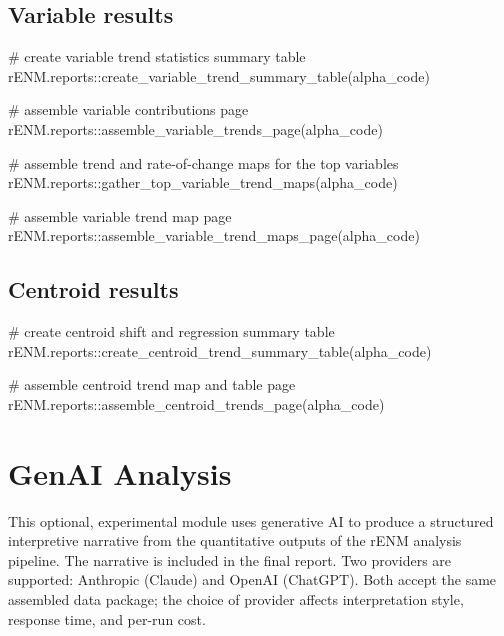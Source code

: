 \documentclass[
  letterpaper,
  DIV=11,
  numbers=noendperiod]{scrartcl}
\newenvironment{Shaded}{\begin{snugshade}}{\end{snugshade}}
\newcommand{\CommentTok}[1]{\textcolor[rgb]{0.37,0.37,0.37}{#1}}
\newcommand{\FunctionTok}[1]{\textcolor[rgb]{0.28,0.35,0.67}{#1}}
\newcommand{\NormalTok}[1]{\textcolor[rgb]{0.00,0.23,0.31}{#1}}
\newcommand{\SpecialCharTok}[1]{\textcolor[rgb]{0.37,0.37,0.37}{#1}}
\begin{document}
\subsection{Variable results}\label{variable-results}

\begin{Shaded}
\begin{Highlighting}[]
\CommentTok{\# create variable trend statistics summary table}
\NormalTok{rENM.reports}\SpecialCharTok{::}\FunctionTok{create\_variable\_trend\_summary\_table}\NormalTok{(alpha\_code)}

\CommentTok{\# assemble variable contributions page}
\NormalTok{rENM.reports}\SpecialCharTok{::}\FunctionTok{assemble\_variable\_trends\_page}\NormalTok{(alpha\_code)}

\CommentTok{\# assemble trend and rate{-}of{-}change maps for the top variables}
\NormalTok{rENM.reports}\SpecialCharTok{::}\FunctionTok{gather\_top\_variable\_trend\_maps}\NormalTok{(alpha\_code)}

\CommentTok{\# assemble variable trend map page}
\NormalTok{rENM.reports}\SpecialCharTok{::}\FunctionTok{assemble\_variable\_trend\_maps\_page}\NormalTok{(alpha\_code)}
\end{Highlighting}
\end{Shaded}

\subsection{Centroid results}\label{centroid-results}

\begin{Shaded}
\begin{Highlighting}[]
\CommentTok{\# create centroid shift and regression summary table}
\NormalTok{rENM.reports}\SpecialCharTok{::}\FunctionTok{create\_centroid\_trend\_summary\_table}\NormalTok{(alpha\_code)}

\CommentTok{\# assemble centroid trend map and table page}
\NormalTok{rENM.reports}\SpecialCharTok{::}\FunctionTok{assemble\_centroid\_trends\_page}\NormalTok{(alpha\_code)}
\end{Highlighting}
\end{Shaded}

\section{GenAI Analysis}\label{genai-analysis}

This optional, experimental module uses generative AI to produce a
structured interpretive narrative from the quantitative outputs of the
rENM analysis pipeline. The narrative is included in the final report.
Two providers are supported: Anthropic (Claude) and OpenAI (ChatGPT).
Both accept the same assembled data package; the choice of provider
affects interpretation style, response time, and per-run cost.
\end{document}
